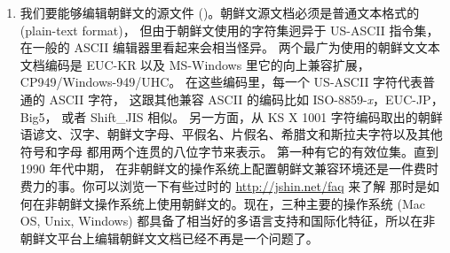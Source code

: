 \begin{enumerate}
\item
我们要能够编辑朝鲜文的源文件 ()。朝鲜文源文档必须是普通文本格式的 (plain-text format)，
但由于朝鲜文使用的字符集迥异于 US-ASCII 指令集，在一般的 ASCII 编辑器里看起来会相当怪异。
两个最广为使用的朝鲜文文本文档编码是 EUC-KR 以及 MS-Windows 里它的向上兼容扩展，CP949/Windows-949/UHC。
在这些编码里，每一个 US-ASCII 字符代表普通的 ASCII 字符，
这跟其他兼容 ASCII 的编码比如 ISO-8859-\textit{x}，EUC-JP， Big5，
或者 Shift\_JIS  相似。
另一方面，从 KS X 1001 字符编码取出的朝鲜语谚文、汉字、朝鲜文字母、平假名、片假名、希腊文和斯拉夫字符以及其他符号和字母
都用两个连贯的八位字节来表示。
第一种有它的有效位集。直到 1990 年代中期，
在非朝鲜文的操作系统上配置朝鲜文兼容环境还是一件费时费力的事。你可以浏览一下有些过时的 \url{http://jshin.net/faq} 来了解
那时是如何在非朝鲜文操作系统上使用朝鲜文的。现在，三种主要的操作系统 (Mac
OS, Unix, Windows) 
都具备了相当好的多语言支持和国际化特征，所以在非朝鲜文平台上编辑朝鲜文文档已经不再是一个问题了。


\end{enumerate}

